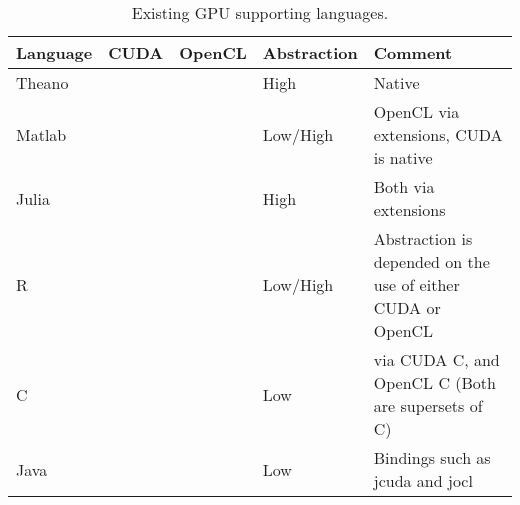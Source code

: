 \begin{table}
	\centering
	\begin{tabular}{|l|c|c|l|l|}
	\hline
	\textbf{Language} & \textbf{CUDA}         & \textbf{OpenCL} & \textbf{Abstraction} & \textbf{Comment}			  		\\ \hline
	Theano   & \cmark           & \cmark            & High      &  Native                                                          \\ \hline
	Matlab   & \cmark           & \cmark            & Low/High        &  OpenCL via extensions, CUDA is native                                                         \\ \hline
	Julia    & \cmark           & \cmark              & High        &  Both via extensions                                                          \\ \hline
	R        & \cmark           & \cmark            & Low/High    & Abstraction is depended on the use of either CUDA or OpenCL \\ \hline
	C   & \cmark           & \cmark            & Low         & via CUDA C, and OpenCL C (Both are supersets of C)                                           \\ \hline
	Java     & \cmark           & \cmark              &   Low          & Bindings such as jcuda and jocl                                            \\ \hline
	\end{tabular}
	\caption{Existing GPU supporting languages. }\label{tbl:sota}
\end{table}
               
